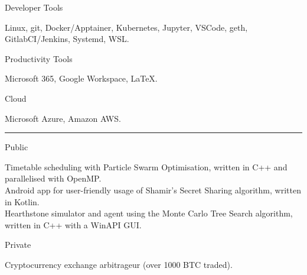 \documentclass[a4paper,10pt]{article}
\newlength{\cvcolumngapwidth}
\newlength{\cvleftcolumnwidth}
\newlength{\cvrightcolumnwidth}
\newcommand{\cvsectionstyle}[1]{{\normalsize\cvsectionfont\textcolor{cvsectioncolor}{#1}}}
\newcommand{\cvheadingstyle}[1]{{\normalsize\cvheadingfont\textcolor{cvheadingcolor}{#1}}}
\newlength{\cvafteritemskipamount}
\newlength{\cvaftersectionskipamount}
\newlength{\cvbetweensectionandheadingextraskipamount}
\newlength{\cvparskip}
\newcommand{\cvsection}[1]{
    \begin{minipage}[t]{\cvleftcolumnwidth}
        \raggedleft\cvsectionstyle{#1}
    \end{minipage}%
    \hspace{\cvcolumngapwidth}%
    \begin{minipage}[t]{\cvrightcolumnwidth}
        \textcolor{cvrulecolor}{\rule{\cvrightcolumnwidth}{0.3mm}}
    \end{minipage}

    \vspace{\cvaftersectionskipamount}
}
\newcommand{\cvitem}[2]{
    \begin{minipage}[t]{\cvleftcolumnwidth}
        \raggedleft #1
    \end{minipage}%
    \hspace{\cvcolumngapwidth}%
    \begin{minipage}[t]{\cvrightcolumnwidth}
        \setlength{\parskip}{\cvparskip} #2
    \end{minipage}

    \vspace{\cvafteritemskipamount}
}
\begin{document}
\cvitem{
    \cvheadingstyle{Developer Tools}
}{
    Linux, git, Docker/Apptainer, Kubernetes, Jupyter, VSCode, geth, GitlabCI/Jenkins, Systemd, WSL.
}

\cvitem{
    \cvheadingstyle{Productivity Tools}
}{
    Microsoft 365, Google Workspace, \LaTeX.
}

\cvitem{
    \cvheadingstyle{Cloud}
}{
    Microsoft Azure, Amazon AWS.
}


\cvsection{PERSONAL PROJECTS}

\vspace{\cvbetweensectionandheadingextraskipamount}

\cvitem{
    \cvheadingstyle{Public}
}{
    Timetable scheduling with Particle Swarm Optimisation, written in C++ and parallelised with OpenMP. \\
    
    Android app for user-friendly usage of Shamir's Secret Sharing algorithm, written in Kotlin. \\
    
    Hearthstone simulator and agent using the Monte Carlo Tree Search algorithm, written in C++ with a WinAPI GUI.
}
\vspace{\cvbetweensectionandheadingextraskipamount}
\cvitem{
    \cvheadingstyle{Private}
}{
    Cryptocurrency exchange arbitrageur (over 1000 BTC traded).
}
\end{document}
